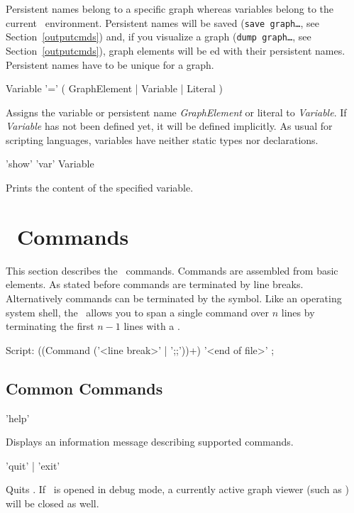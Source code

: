 \begin{note}
Persistent names belong to a specific graph whereas variables belong to the current \GrShell\ environment. Persistent names will be saved (\texttt{save graph\dots}, see Section~\ref{outputcmds}) and, if you visualize a graph (\texttt{dump graph\dots}, see Section~\ref{outputcmds}), graph elements will be ed with their persistent names. Persistent names have to be unique for a graph.
\end{note}

\begin{rail}
  Variable '=' ( GraphElement | Variable | Literal )
\end{rail}
Assigns the variable or persistent name \emph{GraphElement} or literal to \emph{Variable}. If \emph{Variable} has not been defined yet, it will be defined implicitly. As usual for scripting languages, variables have neither static types nor declarations.

\begin{rail} 
'show' 'var' Variable 
\end{rail}
Prints the content of the specified variable.


\section{\GrShell\ Commands}
This section describes the \GrShell\ commands. Commands are assembled from basic elements. 
As stated before commands are terminated by line breaks. Alternatively commands can be terminated by the \indexed{\texttt{;;}} symbol.
Like an operating system shell, the \GrShell\ allows you to span a single command over $n$ lines by terminating the first $n-1$ lines with a .  
\begin{rail}
  Script: ((Command ('<line break>' | ';;'))+) '<end of file>' ;
\end{rail}


\subsection{Common Commands}
\label{commcommands}
\begin{rail}
  'help'
\end{rail}
Displays an information message describing supported commands. 

\begin{rail}
  'quit' | 'exit'
\end{rail}
Quits \GrShell. If \GrShell\ is opened in debug mode, a currently active graph viewer (such as \yComp) will be closed as well.

